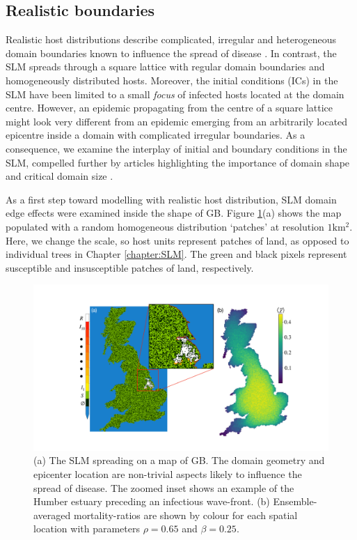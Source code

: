 \subsection{Realistic boundaries}

Realistic host distributions describe complicated, irregular and heterogeneous domain boundaries
known to influence the spread of disease \cite{madden1995plant}.
In contrast, the SLM spreads through a square lattice with regular domain boundaries and homogeneously distributed hosts.
Moreover, the initial conditions (ICs) in the SLM have been limited to a small \textit{focus} of infected hosts
located at the domain centre.
However, an epidemic propagating from the centre of a square lattice might look very different
from an epidemic emerging from an arbitrarily located epicentre inside a domain with complicated irregular boundaries.
As a consequence, we examine the interplay of initial and boundary conditions in the SLM,
compelled further by articles highlighting the importance of domain shape \cite{mikaberidze2016invasiveness} and critical domain size \cite{abad2020reaction, reimer2017critical}.

As a first step toward modelling with realistic host distribution,
SLM domain edge effects were examined inside the shape of GB.
Figure \ref{fig:uk-spread-primer}(a) shows the map populated 
with a random homogeneous distribution `patches' at resolution $1\mathrm{km^2}$. 
Here, we change the scale, so host units represent patches of land, 
as opposed to individual trees in Chapter \ref{chapter:SLM}.
The green and black pixels represent susceptible and insusceptible patches of land, respectively.

\begin{figure}
    \centering
    \includegraphics[scale=0.32]{chapter4/figures/figure1-GB-BCs.pdf}
    \caption{(a) The SLM spreading on a map of GB. The domain geometry and epicenter %
    location are non-trivial aspects likely to influence the spread of disease. The zoomed inset %
    shows an example of the Humber estuary preceding an infectious wave-front. 
    (b) Ensemble-averaged mortality-ratios are shown by colour for each spatial location with 
        parameters $\rho=0.65$ and $\beta=0.25$.}
    \label{fig:uk-spread-primer}
\end{figure}

